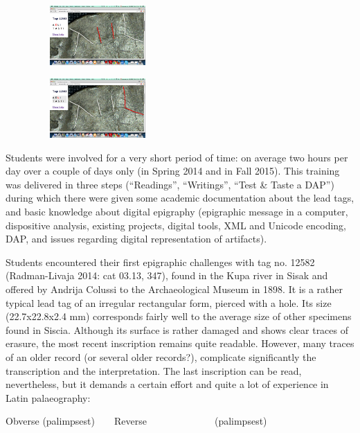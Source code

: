 \documentclass[amsthm,ebook]{saparticle}
\begin{document}
\begin{figure}
\centering
\includegraphics[width=4.941cm,height=2.281cm]{EAGLE16lameetalteaching-img003.png}
\end{figure}
\begin{figure}
\centering
\includegraphics[width=4.941cm,height=2.281cm]{EAGLE16lameetalteaching-img004.png}
\end{figure}
Students were involved for a very short period of time: on average two hours per day over a couple of days only (in
Spring 2014 and in Fall 2015). This training was delivered in three steps (“Readings”, “Writings”, “Test \& Taste a
DAP”) during which there were given some academic documentation about the lead tags, and basic knowledge about digital
epigraphy (epigraphic message in a computer, dispositive analysis, existing projects, digital tools, XML and Unicode
encoding, DAP, and issues regarding digital representation of artifacts).

Students encountered their first epigraphic challenges with tag no. 12582 (Radman-Livaja 2014: cat 03.13, 347), found in
the Kupa river in Sisak and offered by Andrija Colussi to the Archaeological Museum in 1898. It is a rather typical
lead tag of an irregular rectangular form, pierced with a hole. Its size (22.7x22.8x2.4 mm) corresponds fairly well to
the average size of other specimens found in Siscia. Although its surface is rather damaged and shows clear traces of
erasure, the most recent inscription remains quite readable. However, many traces of an older record (or several older
records?), complicate significantly the transcription and the interpretation. The last inscription can be read,
nevertheless, but it demands a certain effort and quite a lot of experience in Latin palaeography:

Obverse (palimpsest)\ \ \ \ Reverse\ \  \ \ \ \ \ \ \ \ \ \ \ \ (palimpsest)
\end{document}
